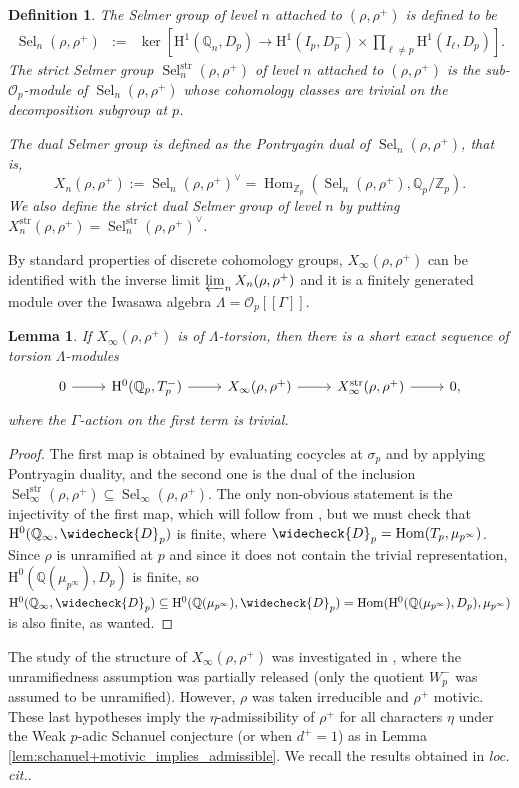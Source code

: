 \documentclass[12pt]{amsart}
\newcommand\bQ{\mathbb{Q}}
\newcommand\Zp{{\mathbb{Z}_p}}
\newcommand\Qp{{\mathbb{Q}_p}}
\newcommand\cO{\mathcal{O}}
\newcommand{\str}{\mathrm{str}}
\DeclareMathOperator{\Hom}{Hom}
\DeclareMathOperator{\Sel}{Sel}
\newcommand{\HH}{\mathrm{H}}
\theoremstyle{defstyle}
\newtheorem{definition}[subsubsection]{Definition}
\theoremstyle{thmstyle}
\newtheorem{lemme}[subsubsection]{Lemma}
\begin{document}
\begin{definition}\label{def:sel}
	The Selmer group of level $n$ attached to $(\rho,\rho^+)$ is defined to be
\[\begin{array}{rcl} \Sel_n(\rho,\rho^+)
&:=& \ker \left[ \HH^1(\bQ_n,D_p) \longrightarrow \HH^1(I_{p},D_p^-) \times \prod_{\ell\neq p} \HH^1(I_{\ell},D_p)  \right].\end{array}\]
The strict Selmer group $\Sel_n^\str(\rho,\rho^+)$ of level $n$ attached to $(\rho,\rho^+)$ is the sub-$\cO_p$-module of $\Sel_n(\rho,\rho^+)$ whose cohomology classes are trivial on the decomposition subgroup at $p$.

The dual Selmer group is defined as the Pontryagin dual of $\Sel_n(\rho,\rho^+)$, that is,
\[X_n(\rho,\rho^+):= \Sel_n(\rho,\rho^+)^\vee = \Hom_\Zp(\Sel_n(\rho,\rho^+),\Qp/\Zp). \]
We also define the strict dual Selmer group of level $n$ by putting $X_n^\str(\rho,\rho^+)=\Sel_n^\str(\rho,\rho^+)^\vee$. 
\end{definition}



By standard properties of discrete cohomology groups, $X_\infty(\rho,\rho^+)$ can be identified with the inverse limit $\varprojlim_n X_n(\rho,\rho^+)$ and it is a finitely generated module over the Iwasawa algebra $\Lambda=\cO_p[[\Gamma]]$.

\begin{lemme}\label{lem:suite_exacte_zeros_triviaux_GV}
	If $X_\infty(\rho,\rho^+)$ is of $\Lambda$-torsion, then there is a short exact sequence of torsion $\Lambda$-modules
	$$\begin{tikzcd}0 \rar & \HH^0(\Qp,T_p^-) \rar & X_\infty(\rho,\rho^+) \rar & X_\infty^\str(\rho,\rho^+) \rar & 0, \end{tikzcd}
	$$
	where the $\Gamma$-action on the first term is trivial. 
\end{lemme}
\begin{proof}
	The first map is obtained by evaluating cocycles at $\sigma_p$ and by applying Pontryagin duality, and the second one is the dual of the inclusion $\Sel_\infty^\str(\rho,\rho^+) \subseteq \Sel_\infty(\rho,\rho^+)$. The only non-obvious statement is the injectivity of the first map, which will follow from \cite[Prop. (2.1)]{greenbergvatsal2000}, but we must check that $\HH^0(\bQ_\infty,\widecheck{D}_p)$ is finite, where  $\widecheck{D}_p=\Hom(T_p,\mu_{p^\infty})$. Since $\rho$ is unramified at $p$ and since it does not contain the trivial representation, $\HH^0({\bQ(\mu_{p^\infty})},D_p)$ is finite, so $\HH^0(\bQ_\infty,\widecheck{D}_p)\subseteq \HH^0(\bQ(\mu_{p^\infty}),\widecheck{D}_p)=\Hom(\HH^0({\bQ(\mu_{p^\infty})},D_p),\mu_{p^\infty})$ is also finite, as wanted.
\end{proof}
The study of the structure of $X_\infty(\rho,\rho^+)$ was investigated in \cite{maks}, where the unramifiedness assumption was partially released (only the quotient $W_p^-$ was assumed to be unramified). However, $\rho$ was taken irreducible and $\rho^+$ motivic. These last hypotheses imply the $\eta$-admissibility of $\rho^+$ for all characters $\eta$ under the Weak $p$-adic Schanuel conjecture (or when $d^+=1$) as in Lemma \ref{lem:schanuel+motivic_implies_admissible}. We recall the results obtained in \textit{loc. cit.}.
\end{document}
